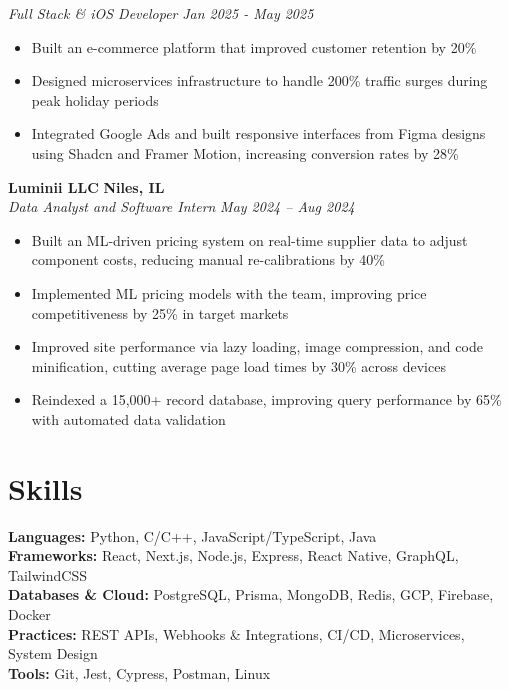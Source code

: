 \documentclass[10pt,letterpaper]{article}
\begin{document}
\textit{Full Stack \& iOS Developer} \hfill \textit{Jan 2025 - May 2025}
\begin{itemize}
  \item Built an e-commerce platform that improved customer retention by 20\%
  \item Designed microservices infrastructure to handle 200\% traffic surges during peak holiday periods
  \item Integrated Google Ads and built responsive interfaces from Figma designs using Shadcn and Framer Motion, increasing conversion rates by 28\%
\end{itemize}
\vspace{0.2em}
\noindent\textbf{Luminii LLC} \hfill \textbf{Niles, IL}\\
\textit{Data Analyst and Software Intern} \hfill \textit{May 2024 -- Aug 2024}
\begin{itemize}
  \item Built an ML-driven pricing system on real-time supplier data to adjust component costs, reducing manual re-calibrations by 40\%
  \item Implemented ML pricing models with the team, improving price competitiveness by 25\% in target markets
  \item Improved site performance via lazy loading, image compression, and code minification, cutting average page load times by 30\% across devices
  \item Reindexed a 15,000+ record database, improving query performance by 65\% with automated data validation
\end{itemize}
\section*{Skills}
\noindent\textbf{Languages:} Python, C/C++, JavaScript/TypeScript, Java\\
\textbf{Frameworks:} React, Next.js, Node.js, Express, React Native, GraphQL, TailwindCSS\\
\textbf{Databases \& Cloud:} PostgreSQL, Prisma, MongoDB, Redis, GCP, Firebase, Docker\\
\textbf{Practices:} REST APIs, Webhooks \& Integrations, CI/CD, Microservices, System Design\\
\textbf{Tools:} Git, Jest, Cypress, Postman, Linux
\end{document}
